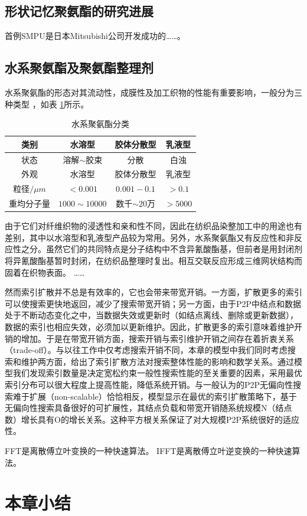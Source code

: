 \subsection{形状记忆聚氨酯的研究进展}
首例SMPU是日本Mitsubishi公司开发成功的……。

\subsection{水系聚氨酯及聚氨酯整理剂}

水系聚氨酯的形态对其流动性，成膜性及加工织物的性能有重要影响，一般分为三种类型\cite{Jiang2005Size} ，如表 \ref{tab:category}所示。

\begin{table}
  \centering
  \caption{水系聚氨酯分类} \label{tab:category}
  \begin{tabular*}{0.9\textwidth}{@{\extracolsep{\fill}}cccc}
  \toprule
    类别			&水溶型		&胶体分散型		&乳液型 \\
  \midrule
    状态			&溶解$\sim$胶束	&分散		&白浊 \\
    外观			&水溶型		&胶体分散型		&乳液型 \\
    粒径$/\mu m$	&$<0.001$		&$0.001-0.1$		&$>0.1$ \\
    重均分子量	&$1000\sim 10000$	&数千$\sim 20万$ &$>5000$ \\
  \bottomrule
  \end{tabular*}
\end{table}

由于它们对纤维织物的浸透性和亲和性不同，因此在纺织品染整加工中的用途也有差别，其中以水溶型和乳液型产品较为常用。另外，水系聚氨酯又有反应性和非反应性之分。虽然它们的共同特点是分子结构中不含异氰酸酯基，但前者是用封闭剂将异氰酸酯基暂时封闭，在纺织品整理时复出。相互交联反应形成三维网状结构而固着在织物表面。
……

然而索引扩散并不总是有效率的，它也会带来带宽开销。一方面，扩散更多的索引可以使搜索更快地返回，减少了搜索带宽开销；另一方面，由于P2P中结点和数据处于不断动态变化之中，当数据失效或更新时（如结点离线、删除或更新数据），数据的索引也相应失效，必须加以更新维护。因此，扩散更多的索引意味着维护开销的增加。于是在带宽开销方面，搜索开销与索引维护开销之间存在着折衷关系（trade-off）。与以往工作中仅考虑搜索开销不同，本章的模型中我们同时考虑搜索和维护两方面，给出了索引扩散方法对搜索整体性能的影响和数学关系。通过模型我们发现索引数量是决定宽松约束一般性搜索性能的至关重要的因素，采用最优索引分布可以很大程度上提高性能，降低系统开销。与一般认为的P2P无偏向性搜索难于扩展（non-scalable）恰恰相反，模型显示在最优的索引扩散策略下，基于无偏向性搜索具备很好的可扩展性，其结点负载和带宽开销随系统规模N（结点数）增长具有O的增长关系。这种平方根关系保证了对大规模P2P系统很好的适应性。

\gls{FFT}是离散傅立叶变换的一种快速算法。
\gls{IFFT}是离散傅立叶逆变换的一种快速算法。
\section{本章小结}
